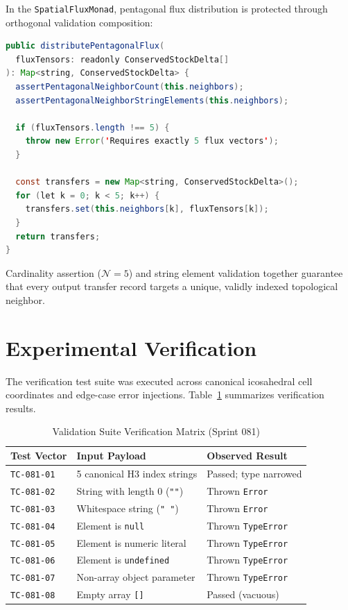 \documentclass[10pt,journal,compsoc]{IEEEtran}
\begin{document}
In the \texttt{SpatialFluxMonad}, pentagonal flux distribution is protected through orthogonal validation composition:
\begin{lstlisting}[language=Java, caption={Monadic flux distribution enforcement}]
public distributePentagonalFlux(
  fluxTensors: readonly ConservedStockDelta[]
): Map<string, ConservedStockDelta> {
  assertPentagonalNeighborCount(this.neighbors);
  assertPentagonalNeighborStringElements(this.neighbors);

  if (fluxTensors.length !== 5) {
    throw new Error('Requires exactly 5 flux vectors');
  }

  const transfers = new Map<string, ConservedStockDelta>();
  for (let k = 0; k < 5; k++) {
    transfers.set(this.neighbors[k], fluxTensors[k]);
  }
  return transfers;
}
\end{lstlisting}
Cardinality assertion ($\mathcal{N} = 5$) and string element validation together guarantee that every output transfer record targets a unique, validly indexed topological neighbor.

\section{Experimental Verification}

The verification test suite was executed across canonical icosahedral cell coordinates and edge-case error injections. Table~\ref{tab:test_matrix} summarizes verification results.

\begin{table}[htbp]
\caption{Validation Suite Verification Matrix (Sprint 081)}
\label{tab:test_matrix}
\centering
\begin{tabular}{@{}lll@{}}
\toprule
Test Vector & Input Payload & Observed Result \\
\midrule
\texttt{TC-081-01} & 5 canonical H3 index strings & Passed; type narrowed \\
\texttt{TC-081-02} & String with length 0 (\texttt{""}) & Thrown \texttt{Error} \\
\texttt{TC-081-03} & Whitespace string (\texttt{"   "}) & Thrown \texttt{Error} \\
\texttt{TC-081-04} & Element is \texttt{null} & Thrown \texttt{TypeError} \\
\texttt{TC-081-05} & Element is numeric literal & Thrown \texttt{TypeError} \\
\texttt{TC-081-06} & Element is \texttt{undefined} & Thrown \texttt{TypeError} \\
\texttt{TC-081-07} & Non-array object parameter & Thrown \texttt{TypeError} \\
\texttt{TC-081-08} & Empty array \texttt{[]} & Passed (vacuous) \\
\bottomrule
\end{tabular}
\end{table}
\end{document}
